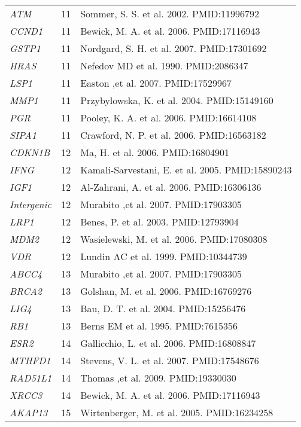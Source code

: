 \documentclass[10pt]{article}
\begin{document}
\begin{landscape}
\begin{center}
\begin{longtable}[H]{lcl}
\textit{ATM} & 11 & Sommer, S. S.  et al. 2002. PMID:11996792\\[2pt]
\textit{CCND1} & 11 & Bewick, M. A.  et al. 2006. PMID:17116943\\[2pt]
\textit{GSTP1} & 11 & Nordgard, S. H.  et al. 2007. PMID:17301692\\[2pt]
\textit{HRAS} & 11 & Nefedov MD et al. 1990. PMID:2086347\\[2pt]
\textit{LSP1} & 11 & Easton ,et al. 2007. PMID:17529967\\[2pt]
\textit{MMP1} & 11 & Przybylowska, K.  et al. 2004. PMID:15149160\\[2pt]
\textit{PGR} & 11 & Pooley, K. A.  et al. 2006. PMID:16614108\\[2pt]
\textit{SIPA1} & 11 & Crawford, N. P.  et al. 2006. PMID:16563182\\[2pt]
\textit{CDKN1B} & 12 & Ma, H.  et al. 2006. PMID:16804901\\[2pt]
\textit{IFNG} & 12 & Kamali-Sarvestani, E.  et al. 2005. PMID:15890243\\[2pt]
\textit{IGF1} & 12 & Al-Zahrani, A.  et al. 2006. PMID:16306136\\[2pt]
\textit{Intergenic} & 12 & Murabito ,et al. 2007. PMID:17903305\\[2pt]
\textit{LRP1} & 12 & Benes, P.  et al. 2003. PMID:12793904\\[2pt]
\textit{MDM2} & 12 & Wasielewski, M.  et al. 2006. PMID:17080308\\[2pt]
\textit{VDR} & 12 & Lundin AC et al. 1999. PMID:10344739\\[2pt]
\textit{ABCC4} & 13 & Murabito ,et al. 2007. PMID:17903305\\[2pt]
\textit{BRCA2} & 13 & Golshan, M.  et al. 2006. PMID:16769276\\[2pt]
\textit{LIG4} & 13 & Bau, D. T.  et al. 2004. PMID:15256476\\[2pt]
\textit{RB1} & 13 & Berns EM et al. 1995. PMID:7615356\\[2pt]
\textit{ESR2} & 14 & Gallicchio, L.  et al. 2006. PMID:16808847\\[2pt]
\textit{MTHFD1} & 14 & Stevens, V. L.  et al. 2007. PMID:17548676\\[2pt]
\textit{RAD51L1} & 14 & Thomas ,et al. 2009. PMID:19330030\\[2pt]
\textit{XRCC3} & 14 & Bewick, M. A.  et al. 2006. PMID:17116943\\[2pt]
\textit{AKAP13} & 15 & Wirtenberger, M.  et al. 2005. PMID:16234258\\[2pt]

\end{longtable}
\end{center}
\end{landscape}
\end{document}
